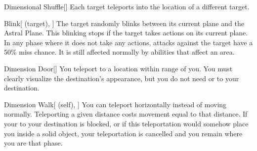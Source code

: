 \lowercase{\hypertarget{spell:Dimensional Shuffle}{}}\label{spell:Dimensional Shuffle}
\begin{freeability}[\nth{2}]{\hypertarget{spell:Dimensional Shuffle}{Dimensional Shuffle}}[]
Each target teleports into the location of a different target.
\end{freeability}
\vspace{0.25em}



\lowercase{\hypertarget{spell:Blink}{}}\label{spell:Blink}
\begin{attuneability}[\nth{3}]{\hypertarget{spell:Blink}{Blink}}[ (target), ]
The target randomly blinks between its current plane and the Astral Plane.
This blinking stops if the target takes actions on its current plane.
In any phase where it does not take any actions,  attacks against the target have a 50\% miss chance.
It is still affected normally by abilities that affect an area.
\end{attuneability}
\vspace{0.25em}



\lowercase{\hypertarget{spell:Dimension Door}{}}\label{spell:Dimension Door}
\begin{freeability}[\nth{3}]{\hypertarget{spell:Dimension Door}{Dimension Door}}[]
You teleport to a location within \rngext range of you.
You must clearly visualize the destination's appearance, but you do not need  or  to your destination.
\end{freeability}
\vspace{0.25em}



\lowercase{\hypertarget{spell:Dimension Walk}{}}\label{spell:Dimension Walk}
\begin{attuneability}[\nth{3}]{\hypertarget{spell:Dimension Walk}{Dimension Walk}}[ (self), ]
You can teleport horizontally instead of moving normally.
Teleporting a given distance costs movement equal to that distance.
If your  to your destination is blocked, or if this teleportation would somehow place you inside a solid object, your teleportation is cancelled and you remain where you are that phase.
\end{attuneability}
\vspace{0.25em}



